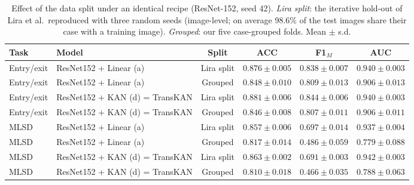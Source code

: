 \begin{table}[t]
\centering
\caption{Effect of the data split under an identical recipe (ResNet-152, seed 42). \emph{Lira split}: the iterative hold-out of Lira et al.\ reproduced with three random seeds (image-level; on average 98.6\% of the test images share their case with a training image). \emph{Grouped}: our five case-grouped folds. Mean $\pm$ s.d.}
\label{tab:vazamento}
\scriptsize
\begin{tabular}{llcccc}
\hline
Task & Model & Split & ACC & F1$_M$ & AUC \\
\hline
Entry/exit & ResNet152 + Linear (a) & Lira split & $0.876\pm0.005$ & $0.838\pm0.007$ & $0.940\pm0.003$ \\
Entry/exit & ResNet152 + Linear (a) & Grouped & $0.848\pm0.010$ & $0.809\pm0.013$ & $0.906\pm0.013$ \\
Entry/exit & ResNet152 + KAN (d) = TransKAN & Lira split & $0.881\pm0.006$ & $0.844\pm0.006$ & $0.940\pm0.003$ \\
Entry/exit & ResNet152 + KAN (d) = TransKAN & Grouped & $0.846\pm0.008$ & $0.807\pm0.011$ & $0.906\pm0.011$ \\
MLSD & ResNet152 + Linear (a) & Lira split & $0.857\pm0.006$ & $0.697\pm0.014$ & $0.937\pm0.004$ \\
MLSD & ResNet152 + Linear (a) & Grouped & $0.817\pm0.014$ & $0.486\pm0.059$ & $0.779\pm0.088$ \\
MLSD & ResNet152 + KAN (d) = TransKAN & Lira split & $0.863\pm0.002$ & $0.691\pm0.003$ & $0.942\pm0.003$ \\
MLSD & ResNet152 + KAN (d) = TransKAN & Grouped & $0.810\pm0.018$ & $0.466\pm0.035$ & $0.788\pm0.063$ \\
\hline
\end{tabular}
\end{table}
